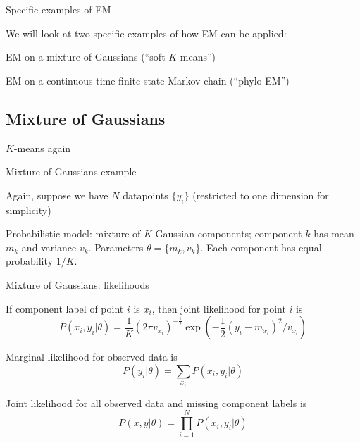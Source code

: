 \documentclass{beamer}
\begin{document}
\begin{frame}{Specific examples of EM}

We will look at two specific examples of how EM can be applied:
\itemb
\item EM on a mixture of Gaussians (``soft $K$-means'')
\item EM on a continuous-time finite-state Markov chain (``phylo-EM'')
\iteme

\end{frame}

\subsection{Mixture of Gaussians}

\begin{frame}{$K$-means again}

Mixture-of-Gaussians example
 \itemb
 \item Again, suppose we have $N$ datapoints $\{y_i\}$ (restricted to one dimension for simplicity)
 \item Probabilistic model: mixture of $K$ Gaussian components; component $k$ has mean $m_k$ and variance $v_k$.
Parameters $\theta = \{ m_k, v_k \}$.
Each component has equal probability $1/K$.
\iteme

\end{frame}

\begin{frame}{Mixture of Gaussians: likelihoods}

\itemb
 \item If component label of point $i$ is $x_i$, then joint likelihood for point $i$ is
\[
P(x_i,y_i|\theta) = \frac{1}{K} (2\pi v_{x_i})^{-\frac{1}{2}} \exp(-\frac{1}{2}(y_i-m_{x_i})^2/v_{x_i})
\]
 \item Marginal likelihood for observed data is
\[
P(y_i|\theta) = \sum_{x_i} P(x_i,y_i|\theta)
\]
 \item Joint likelihood for all observed data and missing component labels is
\[
P(x,y|\theta) = \prod_{i=1}^N P(x_i,y_i|\theta)
\]
\iteme

\end{frame}
\end{document}
